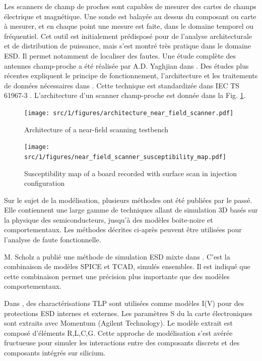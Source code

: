 Les scanners de champ de proches sont capables de mesurer des cartes de champs électrique et magnétique.
Une sonde est balayée au dessus du composant ou carte à mesurer, et en chaque point une mesure est faite, dans le domaine temporel ou fréquentiel.
Cet outil est initialement prédisposé pour de l'analyse architecturale et de distribution de puissance, mais s'est montré très pratique dans le domaine ESD.
Il permet notamment de localiser des fautes.
Une étude complète des antennes champ-proche a été réalisée par A.D. Yaghjian dans \cite{nfsFirstStudy}.
Des études plus récentes expliquent le principe de fonctionnement, l'architecture et les traitements de données nécessaires dans \cite{near-field-scan, planarNFSAntenna, NFSMeasurements, NFScanner}.
Cette technique est standardizée dans IEC TS 61967-3 \cite{iec61967}.
L'architecture d'un scanner champ-proche est donnée dans la Fig. \ref{fig:near-field-scanner}.

\begin{figure}[!h]
  \centering
  \texttt{[image: src/1/figures/architecture\_near\_field\_scanner.pdf]}
  \caption{Architecture of a near-field scanning testbench}
  \label{fig:near-field-scanner}
\end{figure}

\begin{figure}[!h]
  \centering
  \texttt{[image: src/1/figures/near\_field\_scanner\_susceptibility\_map.pdf]}
  \caption{Susceptibility map of a board recorded with surface scan in injection configuration \cite{}}
  \label{fig:near-field-scan-map}
\end{figure}

Sur le sujet de la modélisation, plusieurs méthodes ont été publiées par le passé.
Elle contiennent une large gamme de techniques allant de simulation 3D basés sur la physique des semiconducteurs, jusqu'à des modèles boite-noire et comportementaux.
Les méthodes décrites ci-après peuvent être utilisées pour l'analyse de faute fonctionnelle.

M. Scholz a publié une méthode de simulation ESD mixte dans \cite{mixedModeESDSims}.
C'est la combinaison de modèles SPICE et TCAD, simulés ensembles.
Il est indiqué que cette combinaison permet une précision plus importante que des modèles comportementaux.

Dans \cite{usb2ESDProtection}, des charactérisations TLP sont utilisées comme modèles I(V) pour des protections ESD internes et externes.
Les paramètres S du la carte électroniques sont extraits avec Momentum (Agilent Technology).
Le modèle extrait est composé d'éléments R,L,C,G.
Cette approche de modélisation s'est avérée fructueuse pour simuler les interactions entre des composants discrets et des composants intégrés sur silicium.


